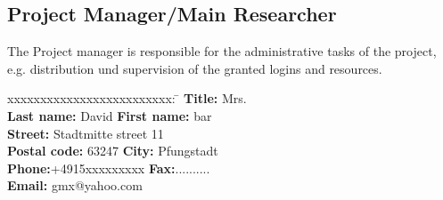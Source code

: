 \documentclass[accentcolor=tud9c,nochapname,11pt]{tudexercise}
\begin{document}
\begin{Form}
\subsection{Project Manager/Main Researcher}
The Project manager is responsible for the administrative tasks of the project, e.g. distribution und supervision of the granted logins and resources.   \\
\begin{tabbing}
xxxxxxxxxxxxxxxxxxxxxxxxx:  \= \kill
\textbf{Title:}  Mrs. \\
\textbf{Last name:} David  \>  \textbf{First name:} bar  \\
\textbf{Street:} Stadtmitte street 11  \\
\textbf{Postal code:} 63247   \> \textbf{City:} Pfungstadt  \\
\textbf{Phone:}+4915xxxxxxxxx  \> \textbf{Fax:}..........   \\
\textbf{Email:} gmx@yahoo.com \\
\end{tabbing}

\end{Form}
\end{document}
